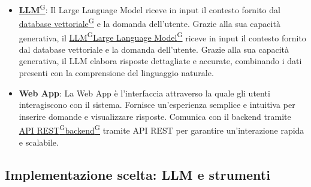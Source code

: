 \begin{itemize}
    \item \href{https://code7crusaders.github.io/docs/RTB/documentazione_interna/glossario.html#llm-large-language-model}{\textbf{LLM}\textsuperscript{G}}:  
    Il Large Language Model riceve in input il contesto fornito dal \href{https://code7crusaders.github.io/docs/RTB/documentazione_interna/glossario.html#database-vettoriale}{database vettoriale\textsuperscript{G}} e la domanda dell’utente. Grazie alla sua capacità generativa, il \href{https://code7crusaders.github.io/docs/RTB/documentazione_interna/glossario.html#llm-large-language-model}{LLM\textsuperscript{G}}\href{https://code7crusaders.github.io/docs/RTB/documentazione_interna/glossario.html#llm-large-language-model}{Large Language Model\textsuperscript{G}} riceve in input il contesto fornito dal database vettoriale e la domanda dell’utente. Grazie alla sua capacità generativa, il LLM elabora risposte dettagliate e accurate, combinando i dati presenti con la comprensione del linguaggio naturale.
    
    \item \textbf{Web App}:  
    La Web App è l’interfaccia attraverso la quale gli utenti interagiscono con il sistema. Fornisce un’esperienza semplice e intuitiva per inserire domande e visualizzare risposte. Comunica con il backend tramite \href{https://code7crusaders.github.io/docs/RTB/documentazione_interna/glossario.html#api-rest-representational-state-transfer}{API REST\textsuperscript{G}}\href{https://code7crusaders.github.io/docs/RTB/documentazione_interna/glossario.html#backend}{backend\textsuperscript{G}} tramite API REST per garantire un'interazione rapida e scalabile.
\end{itemize}

\subsection{Implementazione scelta: LLM e strumenti}
